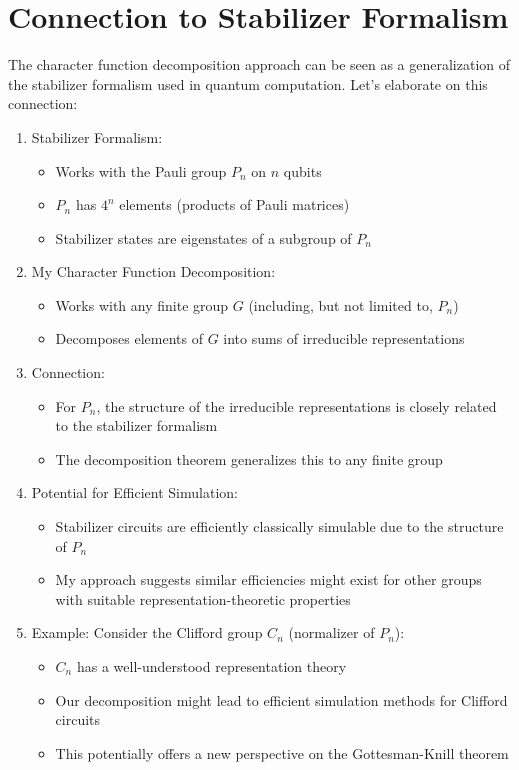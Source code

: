 \documentclass[11pt,a4paper]{article}
\begin{document}
\section{Connection to Stabilizer Formalism}
The character function decomposition approach can be seen as a generalization of the stabilizer formalism used in quantum computation\cite{Gottesman1997}. Let's elaborate on this connection:
\begin{enumerate}
\item Stabilizer Formalism:
\begin{itemize}
\item Works with the Pauli group $P_n$ on $n$ qubits
\item $P_n$ has $4^n$ elements (products of Pauli matrices)
\item Stabilizer states are eigenstates of a subgroup of $P_n$
\end{itemize}
\item My Character Function Decomposition:
\begin{itemize}
    \item Works with any finite group $G$ (including, but not limited to, $P_n$)
    \item Decomposes elements of $G$ into sums of irreducible representations
\end{itemize}

\item Connection:
\begin{itemize}
    \item For $P_n$, the structure of the irreducible representations is closely related to the stabilizer formalism
    \item The decomposition theorem generalizes this to any finite group
\end{itemize}

\item Potential for Efficient Simulation:
\begin{itemize}
    \item Stabilizer circuits are efficiently classically simulable due to the structure of $P_n$\cite{Aaronson2004}
    \item My approach suggests similar efficiencies might exist for other groups with suitable representation-theoretic properties
\end{itemize}

\item Example:
Consider the Clifford group $C_n$ (normalizer of $P_n$):
\begin{itemize}
    \item $C_n$ has a well-understood representation theory\cite{Gross2006}
    \item Our decomposition might lead to efficient simulation methods for Clifford circuits
    \item This potentially offers a new perspective on the Gottesman-Knill theorem\cite{GottesmanKnill}
\end{itemize}

\end{enumerate}
\end{document}

